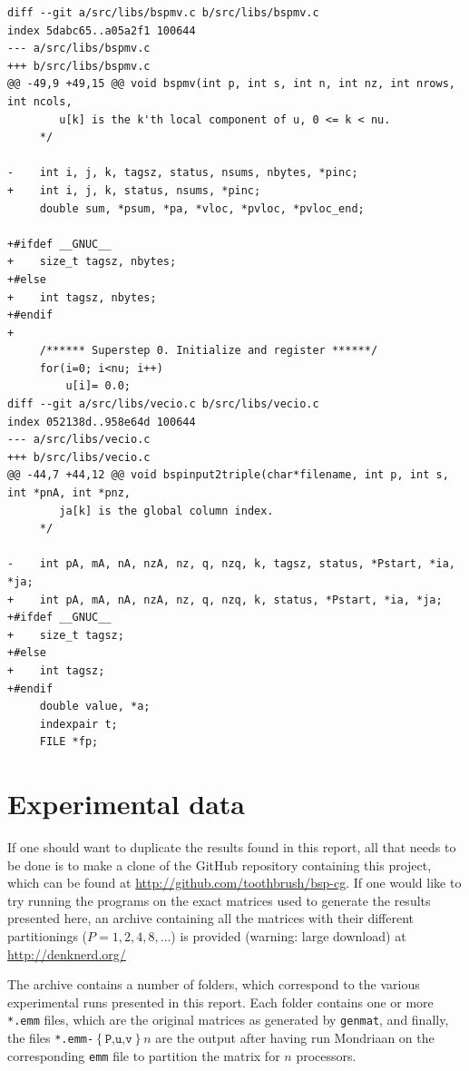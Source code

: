 \documentclass[a4paper]{article}
\begin{document}
\begin{verbatim}
diff --git a/src/libs/bspmv.c b/src/libs/bspmv.c
index 5dabc65..a05a2f1 100644
--- a/src/libs/bspmv.c
+++ b/src/libs/bspmv.c
@@ -49,9 +49,15 @@ void bspmv(int p, int s, int n, int nz, int nrows, int ncols,
        u[k] is the k'th local component of u, 0 <= k < nu.
     */
 
-    int i, j, k, tagsz, status, nsums, nbytes, *pinc;
+    int i, j, k, status, nsums, *pinc;
     double sum, *psum, *pa, *vloc, *pvloc, *pvloc_end;
 
+#ifdef __GNUC__
+    size_t tagsz, nbytes;
+#else
+    int tagsz, nbytes;
+#endif
+
     /****** Superstep 0. Initialize and register ******/
     for(i=0; i<nu; i++)
         u[i]= 0.0;
diff --git a/src/libs/vecio.c b/src/libs/vecio.c
index 052138d..958e64d 100644
--- a/src/libs/vecio.c
+++ b/src/libs/vecio.c
@@ -44,7 +44,12 @@ void bspinput2triple(char*filename, int p, int s, int *pnA, int *pnz,
        ja[k] is the global column index.
     */
 
-    int pA, mA, nA, nzA, nz, q, nzq, k, tagsz, status, *Pstart, *ia, *ja;
+    int pA, mA, nA, nzA, nz, q, nzq, k, status, *Pstart, *ia, *ja;
+#ifdef __GNUC__
+    size_t tagsz;
+#else
+    int tagsz;
+#endif
     double value, *a;
     indexpair t;
     FILE *fp;
\end{verbatim}
\clearpage

\section{Experimental data}

If one should want to duplicate the results found in this report, all that needs to be done
is to make a clone of the GitHub repository containing this project, which can be found at
\url{http://github.com/toothbrush/bsp-cg}. If one would like to try running the programs on the exact matrices
used to generate the results presented here, an archive containing all the matrices with their
different partitionings ($P=1,2,4,8, \ldots$) is provided (warning: large
download) at \url{http://denknerd.org/} %

The archive contains a number of folders, which correspond to the various experimental runs
presented in this report. Each folder contains one or more \texttt{*.emm} files, which are the original
matrices as generated by \texttt{genmat}, and finally, the files \texttt{*.emm-$\left\{\texttt{P,u,v}\right\}n$} are
the output after having run Mondriaan on the corresponding \texttt{emm} file to partition the matrix for $n$ processors.
\end{document}
